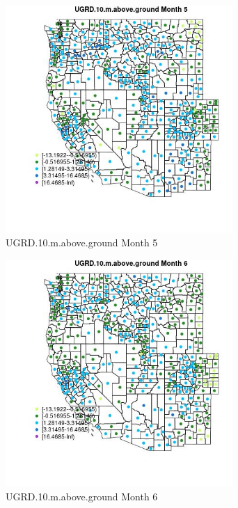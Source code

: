 \begin{figure} 
\centering  
\includegraphics[width=0.77\textwidth]{Code_Outputs/df_report_ML_predictors_CountyCentroid_Locations_Dates_2008-01-01to2018-12-31_MapObsMo5UGRD10maboveground.jpg} 
\caption{\label{fig:df_report_ML_predictors_CountyCentroid_Locations_Dates_2008-01-01to2018-12-31MapObsMo5UGRD10maboveground}UGRD.10.m.above.ground Month 5} 
\end{figure} 
 

\clearpage 

\begin{figure} 
\centering  
\includegraphics[width=0.77\textwidth]{Code_Outputs/df_report_ML_predictors_CountyCentroid_Locations_Dates_2008-01-01to2018-12-31_MapObsMo6UGRD10maboveground.jpg} 
\caption{\label{fig:df_report_ML_predictors_CountyCentroid_Locations_Dates_2008-01-01to2018-12-31MapObsMo6UGRD10maboveground}UGRD.10.m.above.ground Month 6} 
\end{figure} 
 

